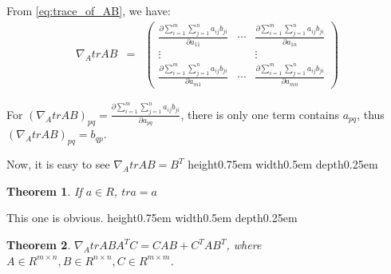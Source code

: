 \documentclass[a4paper]{article}
\newtheorem{theorem}{Theorem}[section]
\newenvironment{proof}[1][Proof]{\begin{trivlist}
\item[\hskip \labelsep {\bfseries #1}]}{\end{trivlist}}
\newcommand{\qed}{\nobreak \ifvmode \relax \else
      \ifdim\lastskip<1.5em \hskip-\lastskip
      \hskip1.5em plus0em minus0.5em \fi \nobreak
      \vrule height0.75em width0.5em depth0.25em\fi}
\begin{document}
\begin{proof}
	From \cref{eq:trace_of_AB}, we have:
	\begin{eqnarray}
		\nabla_AtrAB & = &
		\begin{pmatrix}
			\frac{\partial \sum\limits^{m}_{i=1}\sum\limits^{n}_{j=1}a_{ij}b_{ji}}{\partial a_{11}} & \cdots & \frac{\partial \sum\limits^{m}_{i=1}\sum\limits^{n}_{j=1}a_{ij}b_{ji}}{\partial a_{1n}}\\
			\vdots &  & \vdots\\
			\frac{\partial \sum\limits^{m}_{i=1}\sum\limits^{n}_{j=1}a_{ij}b_{ji}}{\partial a_{m1}} & \cdots & \frac{\partial \sum\limits^{m}_{i=1}\sum\limits^{n}_{j=1}a_{ij}b_{ji}}{\partial a_{mn}}
		\end{pmatrix}
		\label{eq:nabla_trace_AB}
	\end{eqnarray}

	For $(\nabla_AtrAB)_{pq} = \frac{\partial
	\sum\limits^{m}_{i=1}\sum\limits^{n}_{j=1}a_{ij}b_{ji}}{\partial
	a_{pq}}$, there is only one term contains $a_{pq}$,
	thus $(\nabla_AtrAB)_{pq} = b_{qp}$.

	Now, it is easy to see $\nabla_AtrAB = B^T$\qed

\end{proof}

\begin{theorem}
	If $a \in R$, $tra = a$
\end{theorem}

\begin{proof}
	This one is obvious.\qed
\end{proof}

\begin{theorem}
	$\nabla_A trABA^TC = CAB + C^TAB^T$, where $A \in R^{m \times n}, B
  \in R^{n \times n}, C \in R^{m \times m}$.
\end{theorem}
\end{document}
